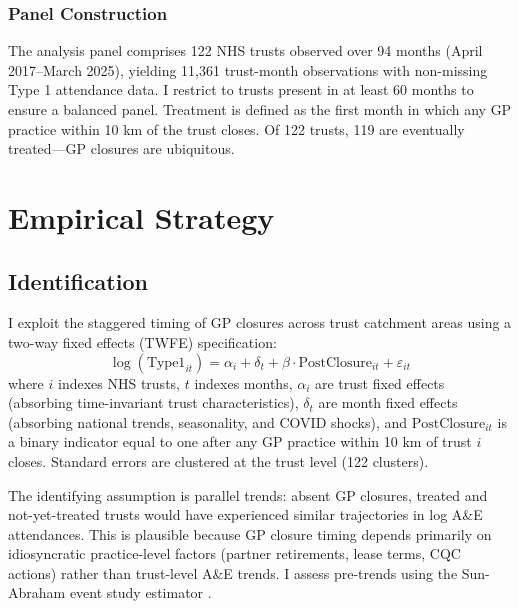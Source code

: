 \documentclass[12pt]{article}
\begin{document}
\subsubsection*{Panel Construction}
The analysis panel comprises 122 NHS trusts observed over 94 months (April 2017--March 2025), yielding 11,361 trust-month observations with non-missing Type 1 attendance data. I restrict to trusts present in at least 60 months to ensure a balanced panel. Treatment is defined as the first month in which any GP practice within 10 km of the trust closes. Of 122 trusts, 119 are eventually treated---GP closures are ubiquitous.




\section{Empirical Strategy}

\subsection{Identification}

I exploit the staggered timing of GP closures across trust catchment areas using a two-way fixed effects (TWFE) specification:
\begin{equation}
\log(\text{Type1}_{it}) = \alpha_i + \delta_t + \beta \cdot \text{PostClosure}_{it} + \varepsilon_{it}
\label{eq:twfe}
\end{equation}
where $i$ indexes NHS trusts, $t$ indexes months, $\alpha_i$ are trust fixed effects (absorbing time-invariant trust characteristics), $\delta_t$ are month fixed effects (absorbing national trends, seasonality, and COVID shocks), and $\text{PostClosure}_{it}$ is a binary indicator equal to one after any GP practice within 10 km of trust $i$ closes. Standard errors are clustered at the trust level (122 clusters).

The identifying assumption is parallel trends: absent GP closures, treated and not-yet-treated trusts would have experienced similar trajectories in log A\&E attendances. This is plausible because GP closure timing depends primarily on idiosyncratic practice-level factors (partner retirements, lease terms, CQC actions) rather than trust-level A\&E trends. I assess pre-trends using the Sun-Abraham event study estimator \citep{sunAbraham2021}.
\end{document}
